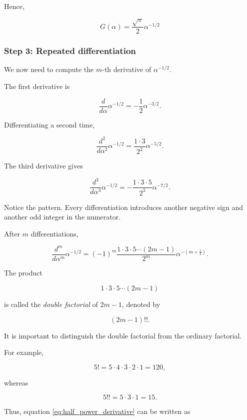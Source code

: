\documentclass[11pt,a4paper]{article}
\theoremstyle{definition}
\theoremstyle{remark}
\begin{document}
Hence,

\begin{equation}
    \boxed{
    G(\alpha)
    =
    \frac{\sqrt{\pi}}{2}
    \alpha^{-1/2}
    }
    \label{eq:gaussian_even_G}
\end{equation}

\subsubsection*{Step 3: Repeated differentiation}

We now need to compute the
$m$-th derivative of
$\alpha^{-1/2}$.

The first derivative is

\[
    \frac{d}{d\alpha}
    \alpha^{-1/2}
    =
    -\frac{1}{2}\alpha^{-3/2}.
\]

Differentiating a second time,

\[
    \frac{d^2}{d\alpha^2}
    \alpha^{-1/2}
    =
    \frac{1\cdot3}{2^2}
    \alpha^{-5/2}.
\]

The third derivative gives

\[
    \frac{d^3}{d\alpha^3}
    \alpha^{-1/2}
    =
    -\frac{1\cdot3\cdot5}{2^3}
    \alpha^{-7/2}.
\]

Notice the pattern. Every
differentiation introduces
another negative sign and
another odd integer in the
numerator.

After $m$ differentiations,


\begin{equation}
    \frac{d^m}{d\alpha^m}\alpha^{-1/2}
    =
    (-1)^m
    \frac{1\cdot3\cdot5\cdots(2m-1)}{2^m}
    \alpha^{-\left(m+\frac12\right)}.
    \label{eq:half_power_derivative}
\end{equation}


The product

\[
    1\cdot3\cdot5\cdots(2m-1)
\]

is called the \emph{double factorial}
of $2m-1$, denoted by

\[
    (2m-1)!!.
\]

It is important to distinguish
the double factorial from the
ordinary factorial.

For example,

\[
    5!=5\cdot4\cdot3\cdot2\cdot1=120,
\]

whereas

\[
    5!!=5\cdot3\cdot1=15.
\]

Thus, equation
\eqref{eq:half_power_derivative}
can be written as
\end{document}

